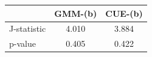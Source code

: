 \begin{tabular}{lcc}
  \hline
 & GMM-(b) & CUE-(b) \\ 
  \hline
J-statistic & 4.010 & 3.884 \\ 
  p-value & 0.405 & 0.422 \\ 
   \hline
\end{tabular}
